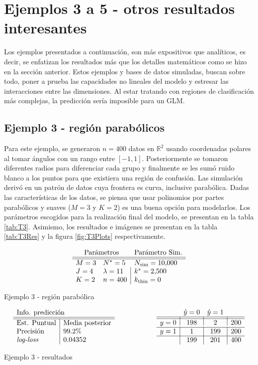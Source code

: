 \documentclass[../Main/Main.tex]{subfiles}
\begin{document}
\section{Ejemplos 3 a 5 - otros resultados interesantes} \label{sec:T3-5}
Los ejemplos presentados a continuación, son más expositivos que analíticos, es decir, se enfatizan los resultados más que los detalles matemáticos como se hizo en la sección anterior. Estos ejemplos y bases de datos simuladas, buscan sobre todo, poner a prueba las capacidades no lineales del modelo y estresar las interacciones entre las dimensiones. Al estar tratando con regiones de clasificación más complejas, la predicción sería imposible para un GLM.

\subsection*{Ejemplo 3 - región parabólicos}
Para este ejemplo, se generaron $n = 400$ datos en $\mathbb{R}^2$ usando coordenadas polares al tomar ángulos con un rango entre $[-1,1]$. Posteriormente se tomaron diferentes radios para diferenciar cada grupo y finalmente se les sumó ruido blanco a los puntos para que existiera una región de confusión. Las simulación derivó en un patrón de datos cuya frontera es curva, inclusive parabólica. Dadas las características de los datos, se piensa que usar polinomios por partes parabólicos y suaves ($M = 3$ y $K = 2$) es una buena opción para modelarlos. Los parámetros escogidos para la realización final del modelo, se presentan en la tabla \ref{tab:T3}. Asimismo, los resultados e imágenes se presentan en la tabla \ref{tab:T3Res} y la figura \ref{fig:T3Plots} respectivamente.

\begin{table}[h]
$$\paramsmod{3}{4}{2}{5}{11}{400}{\num{10000}}{\num{2500}}{0}$$
\caption{Ejemplo 3 - región parabólica}
\label{tab:T3}
\end{table}

\begin{table}[h]
\begin{align*}
\resultados{\text{Media posterior}}{99.2}{0.04352}
\qquad\qquad\qquad
\matconf{198}{2}{200}{1}{199}{200}{199}{201}{400}
\end{align*}
\caption{Ejemplo 3 - resultados}
\label{tab:T3Res}
\end{table}
\end{document}
